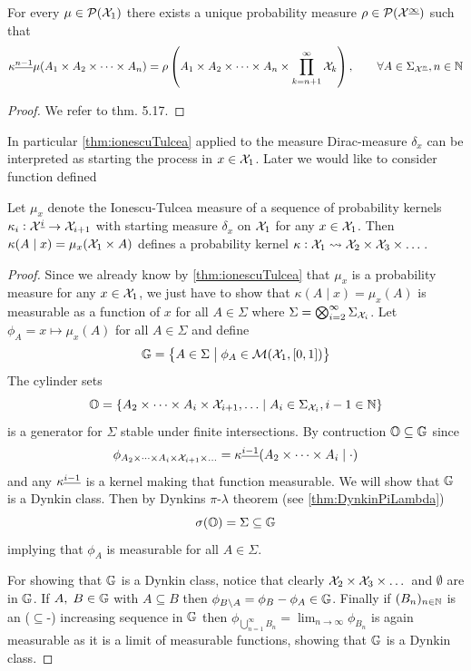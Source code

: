 \begin{thm}
  For every $\mu \in \mathcal{P}(\mathcal{X}_1)$ 
  there exists a unique probability measure
  $\rho \in \mathcal{P}(\mathcal{X}^{\underline{\infty}})$ such that
  \[ \kappa^{\underline{n-1}} \mu (A_1 \times A_2 \times \dots \times A_n) = \rho
    \left( A_1 \times A_2 \times \dots \times A_n \times
    \prod_{k=n+1}^\infty \mathcal{X}_k \right)
  , \qquad \forall A \in \Sigma_{\mathcal{X}^{\underline{n}}}, n \in \mathbb{N} \]
  \label{thm:ionescuTulcea}
\end{thm}
\begin{proof}
  We refer to  thm. 5.17. %
\end{proof}

In particular \cref{thm:ionescuTulcea} applied to the measure Dirac-measure
$\delta_x$ can be interpreted as starting the process in $x \in \mathcal{X}_1$.
Later we would like to consider function defined

\begin{prop}
  Let $\mu_x$ denote the Ionescu-Tulcea measure of a
  sequence of probability kernels
  $\kappa_i : \mathcal{X}^{\underline{i}} \to \mathcal{X}_{i+1}$
  with starting measure $\delta_x$ on $\mathcal{X}_1$ for any $x \in \mathcal{X}_1$.
  Then $\kappa(A \mid x) = \mu_x(\mathcal{X}_1 \times A)$ defines a probability kernel
  $\kappa : \mathcal{X}_1 \leadsto \mathcal{X}_2 \times \mathcal{X}_3 \times \dots$.
\end{prop}
\begin{proof}
  Since we already know by \cref{thm:ionescuTulcea}
  that $\mu_x$ is a probability measure for any
  $x \in \mathcal{X}_1$,
  we just have to show that $\kappa(A \mid x) = \mu_x(A)$ is measurable
  as a function of $x$ for all
  $A \in \Sigma$ where $\Sigma = \bigotimes_{i=2}^\infty \Sigma_{\mathcal{X}_i}$.
  Let $\phi_A = x \mapsto \mu_x(A)$
  for all $A \in \Sigma$ and define
  \[ \mathbb{G} = \left\{ A \in \Sigma
  \;\middle\vert\; \phi_A \in \mathcal{M}(\mathcal{X}_1, [0,1]) \right\} \]
  The cylinder sets
  \[ \mathbb{O} = \left\{ A_2 \times \dots \times A_i \times \mathcal{X}_{i+1},
  \dots \;\middle\vert\; A_i \in \Sigma_{\mathcal{X}_i}, i-1 \in \mathbb{N} \right\} \]
  is a generator for $\Sigma$ stable under 
  finite intersections.
  By contruction $\mathbb{O} \subseteq \mathbb{G}$ since
  \[ \phi_{A_2 \times \dots \times A_i \times \mathcal{X}_{i+1} \times \dots}
  = \kappa^{\underline{i-1}}(A_2 \times \dots \times A_i \mid \cdot) \]
  and any $\kappa^{\underline{i-1}}$ is a kernel making that function measurable.
  We will show that $\mathbb{G}$ is a Dynkin class.
  Then by Dynkins $\pi$-$\lambda$ theorem (see \cref{thm:DynkinPiLambda})
  \[ \sigma(\mathbb{O}) = \Sigma
  \subseteq \mathbb{G} \]
  implying that $\phi_A$ is measurable
  for all $A \in \Sigma$.
  
  For showing that $\mathbb{G}$ is a Dynkin class, notice that
  clearly $\mathcal{X}_2 \times \mathcal{X}_3 \times \dots$ and $\emptyset$
  are in $\mathbb{G}$.
  If $A,\; B \in \mathbb{G}$ with $A \subseteq B$ then
  $\phi_{B \setminus A} = \phi_B - \phi_A \in \mathbb{G}$.
  Finally if $(B_n)_{n \in \mathbb{N}}$ is an ($\subseteq$-) increasing sequence
  in $\mathbb{G}$ then $\phi_{\bigcup_{n=1}^\infty B_n} =
  \lim_{n \to \infty} \phi_{B_n}$ is again measurable as it is a
  limit of measurable functions, showing that $\mathbb{G}$ is a Dynkin class.
\end{proof}

